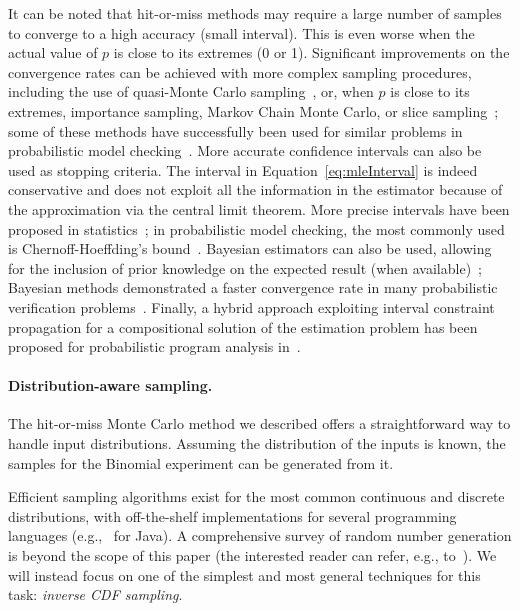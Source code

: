 It can be noted that hit-or-miss methods may require a large number of samples to converge to a high accuracy (small interval). This is even worse when the actual value of $p$ is close to its extremes (0 or 1). Significant improvements on the convergence rates can be achieved with more complex sampling procedures, including the use of quasi-Monte Carlo sampling~\cite{robert2013monte}, or, when $p$ is close to its extremes, importance sampling, Markov Chain Monte Carlo, or slice sampling~\cite{bishop2006pattern}; some of these methods have successfully been used for similar problems in probabilistic model checking~\cite{importanceSamplingSMC,splittingSMC,statisticalModelChecking}. More accurate confidence intervals can also be used as stopping criteria. The interval in Equation~\eqref{eq:mleInterval} is indeed conservative and does not exploit all the information in the estimator because of the approximation via the central limit theorem. More precise intervals have been proposed in statistics~\cite{pestman1998mathematical}; in probabilistic model checking, the most commonly used is Chernoff-Hoeffding's bound~\cite{hoeffding1963probability,approximatePMC,statisticalModelChecking}. Bayesian estimators can also be used, allowing for the inclusion of prior knowledge on the expected result (when available)~\cite{Robert2007BayesianChoice,gelman2003bayesian}; Bayesian methods demonstrated a faster convergence rate in many probabilistic verification problems~\cite{Zuliani:2010:BSM:1755952.1755987}. Finally, a hybrid approach exploiting interval constraint propagation for a compositional solution of the estimation problem has been proposed for probabilistic program analysis in~\cite{Borges2014,2015-fse-qcoral}.

\paragraph{Distribution-aware sampling.} The hit-or-miss Monte Carlo method we described offers a straightforward way to handle input distributions. Assuming the distribution of the inputs is known, the samples for the Binomial experiment can be generated from it.

Efficient sampling algorithms exist for the most common continuous and discrete distributions, with off-the-shelf implementations for several programming languages (e.g.,~\cite{commonsMath3} for Java). A comprehensive survey of random number generation is beyond the scope of this paper (the interested reader can refer, e.g., to~\cite{gentle2013random}). We will instead focus on one of the simplest and most general techniques for this task: \emph{inverse CDF sampling}.


